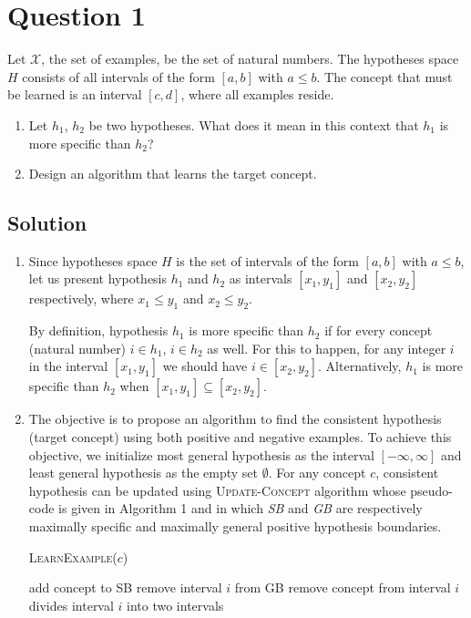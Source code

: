 \section*{Question 1}

Let $\mathcal{X}$, the set of examples, be the set of natural numbers. The hypotheses space $H$ consists of all intervals of the form $[a,b]$ with $a \leq b$. The concept that must be learned is an interval $[c,d]$, where all examples reside.

\begin{enumerate}[label=(\alph*)]
\item Let $h_1$, $h_2$ be two hypotheses. What does it mean in this context that $h_1$ is more specific than $h_2$?
\item Design an algorithm that learns the target concept.
\end{enumerate}

\subsection*{Solution}

\begin{enumerate}[label=(\alph*)]
\item Since hypotheses space $H$ is the set of intervals of the form $[a, b]$ with $a \leq b$, let us present hypothesis $h_1$ and $h_2$ as intervals $[x_1, y_1]$ and $[x_2, y_2]$ respectively, where $x_1 \leq y_1$ and $x_2 \leq y_2$.

By definition, hypothesis $h_1$ is more specific than $h_2$ if for every concept (natural number) $i \in h_1$, $i \in h_2$ as well. For this to happen, for any integer $i$ in the interval $[x_1, y_1]$ we should have $i \in [x_2, y_2]$. Alternatively, $h_1$ is more specific than $h_2$ when $[x_1, y_1] \subseteq [x_2, y_2]$.

\item The objective is to propose an algorithm to find the consistent hypothesis (target concept) using both positive and negative examples. To achieve this objective, we initialize most general hypothesis as the interval $[-\infty, \infty]$ and least general hypothesis as the empty set $\emptyset$.
For any concept $c$, consistent hypothesis can be updated using \textsc{Update-Concept} algorithm whose pseudo-code is given in Algorithm 1 and in which \textit{SB} and \textit{GB} are respectively maximally specific and maximally general positive hypothesis boundaries.

\begin{algorithm}[H]
\caption{\textsc{LearnExample($c$)}}\label{euclid}
\begin{algorithmic}[1]
\State add concept to SB
\State remove interval $i$ from GB
\EndIf
\EndFor
\Else
{}
\State remove concept from interval $i$
\Comment divides interval $i$ into two intervals
\EndIf
\EndFor
\EndIf
\end{algorithmic}
\end{algorithm}

\end{enumerate}

